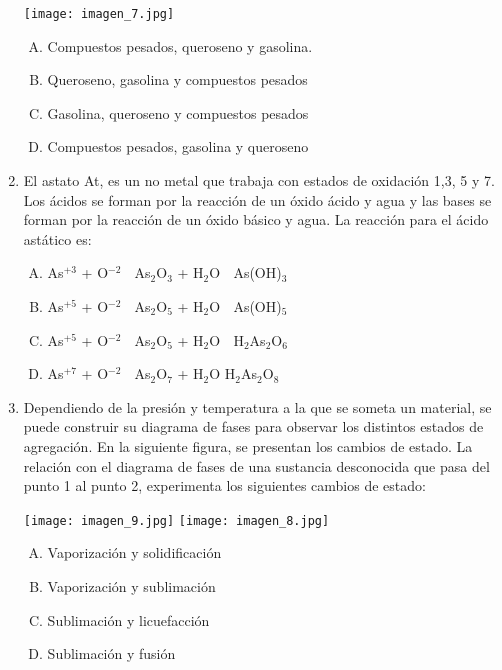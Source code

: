 \begin{enumerate}
\texttt{[image: imagen\_7.jpg]}

\begin{enumerate}[(A)]
\item Compuestos pesados, queroseno y gasolina.
\item Queroseno, gasolina y compuestos pesados
\item Gasolina, queroseno y compuestos pesados
\item Compuestos pesados, gasolina y queroseno 
\end{enumerate}

\item El astato At, es un no metal que trabaja con estados de oxidación 1,3, 5 y 7. Los ácidos se forman por la reacción de un óxido ácido y agua y las bases se forman por la reacción de un óxido básico y agua. La reacción para el ácido astático es: \label{mon-11}


\begin{enumerate}[(A)]
\item As$^{+3}$ + O$^{-2}$ $\;$ As$_2$O$_3$ + H$_2$O $\;$ As(OH)$_3$
\item As$^{+5}$ + O$^{-2}$ $\;$     As$_2$O$_5$ + H$_2$O	 $\;$  As(OH)$_5$ 
\item As$^{+5}$ + O$^{-2}$ $\;$     As$_2$O$_5$ + H$_2$O	 $\;$  H$_2$As$_2$O$_6$
\item As$^{+7}$ + O$^{-2}$ $\;$     As$_2$O$_7$ + H$_2$O	   H$_2$As$_2$O$_8$
\end{enumerate}

\newpage
\item Dependiendo de la presión y temperatura a la que se someta un material, se puede construir su diagrama de fases para observar los distintos estados de agregación. En la siguiente figura, se presentan los cambios de estado. La relación con el diagrama de fases de una sustancia desconocida que pasa del punto 1 al punto 2, experimenta los siguientes cambios de estado: \label{mon-12}

\begin{center}
\texttt{[image: imagen\_9.jpg]}
\texttt{[image: imagen\_8.jpg]}

\end{center}
\begin{enumerate}[(A)]
\item Vaporización y solidificación
\item Vaporización y sublimación
\item Sublimación y licuefacción
\item Sublimación y fusión
\end{enumerate}


\end{enumerate}
